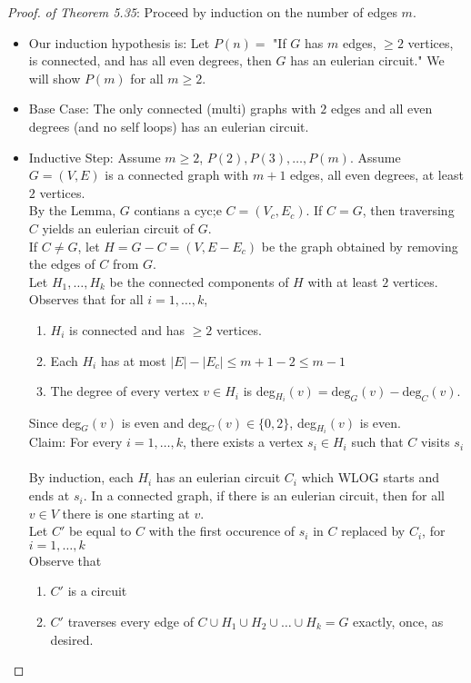 \documentclass[11pt]{scrartcl}
\begin{document}
\begin{proof} \textit{ of Theorem 5.35}: Proceed by induction on the number of edges $m$.\begin{itemize}
    \item Our induction hypothesis is: Let $P(n) = $ "If $G$ has $m $ edges, $\geq 2$ vertices, is connected, and has all even degrees, then $G$ has an eulerian circuit."  We will show $P(m)$ for all $m \geq 2$.
    \item Base Case: The only connected (multi) graphs with $2$ edges and all even degrees (and no self loops) has an eulerian circuit. 
    \item Inductive Step: Assume $m \geq 2$, $P(2), P(3), \dots, P(m)$. Assume $G = (V, E)$ is a connected graph with $m+1$ edges, all even degrees, at least $2$ vertices.  \\
    By the Lemma, $G$ contians a cyc;e $C = (V_c, E_c)$. If $C = G$, then traversing $C$ yields an eulerian circuit of $G$.\\
    If $C \neq G$, let $H = G-C = (V, E-E_c)$ be the graph obtained by removing the edges of $C$ from $G$. \\
    Let $H_1, \dots, H_k$ be the connected components of $H$ with at least $2$ vertices.  Observes that for all $i = 1, \dots, k$, \begin{enumerate}
        \item $H_i$ is connected and has $\geq 2$ vertices. 
        \item Each $H_i$ has at most $|E| - |E_c| \leq m+1 -2 \leq m-1$
        \item The degree of every vertex $v \in H_i$ is deg$_{H_i}(v) = \text{deg}_G(v) - \text{deg}_C(v)$.
    \end{enumerate}
    Since deg$_G(v)$ is even and deg$_C(v) \in \{0, 2\}$, deg$_{H_i}(v)$ is even.\\
    Claim: For every $i=1, \dots, k$, there exists a vertex $s_i \in H_i$ such that $C$ visits $s_i$ \\
    \\
    By induction, each $H_i$ has an eulerian circuit $C_i$ which WLOG starts and ends at $s_i$.  In a connected graph, if there is an eulerian circuit, then for all $v \in V$ there is one starting at $v$.\\
    Let $C'$ be equal to $C$ with the first occurence of $s_i$ in $C$ replaced by $C_i$, for $i=1, \dots, k$\\
    Observe that \begin{enumerate}
        \item $C'$ is a circuit
        \item $C'$ traverses every edge of $C \cup H_1 \cup H_2 \cup \dots \cup H_k = G$ exactly, once, as desired.
    \end{enumerate}
\end{itemize}
\end{proof}
\end{document}
